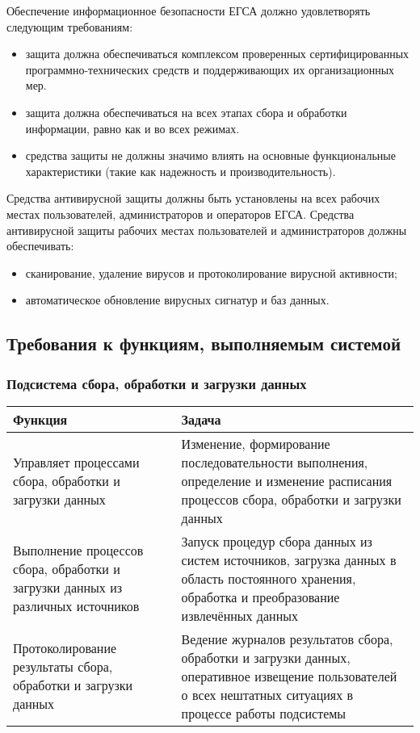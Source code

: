 \documentclass[a4paper, 14pt]{extarticle}
\begin{document}
Обеспечение информационное безопасности ЕГСА должно удовлетворять следующим требованиям:
\begin{itemize}
  \item защита должна обеспечиваться комплексом проверенных сертифицированных
  программно-технических средств и поддерживающих их организационных мер.
  \item защита должна обеспечиваться на всех этапах сбора и обработки
  информации, равно как и во всех режимах.
  \item средства защиты не должны значимо влиять на основные функциональные
  характеристики (такие как надежность и производительность).
\end{itemize}

Средства антивирусной защиты должны быть установлены на всех рабочих местах
пользователей, администраторов и операторов ЕГСА. Средства антивирусной защиты
рабочих местах пользователей и администраторов должны обеспечивать:
\begin{itemize}
  \item сканирование, удаление вирусов и протоколирование вирусной активности;
  \item автоматическое обновление вирусных сигнатур и баз данных.
\end{itemize}

\subsection{Требования к функциям, выполняемым системой}

\subsubsection{Подсистема сбора, обработки и загрузки данных}

\begin{longtable}{|L{0.35\textwidth}|L{0.61\textwidth}|}
  \hline
  \textbf{Функция}                                               &
  \textbf{Задача}                                                     \\
  \hline
  Управляет процессами сбора, обработки и загрузки данных        &
  Изменение, формирование последовательности выполнения, определение и изменение
  расписания процессов сбора, обработки и загрузки данных             \\
  \hline
  Выполнение процессов сбора, обработки и загрузки данных из различных
  источников                                                     &
  Запуск процедур сбора данных из систем источников, загрузка данных в область
  постоянного хранения, обработка и преобразование извлечённых данных \\
  \hline
  Протоколирование результаты сбора, обработки и загрузки данных &
  Ведение журналов результатов сбора, обработки и загрузки данных, оперативное
  извещение пользователей о всех нештатных ситуациях в процессе работы
  подсистемы                                                          \\
  \hline
\end{longtable}
\end{document}
